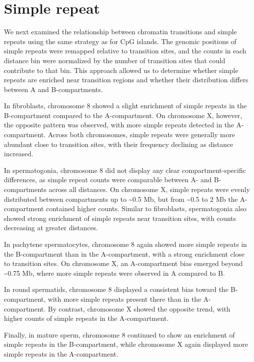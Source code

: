 \documentclass[
  a4paper,
  openany]{scrbook}
\begin{document}
\section{Simple repeat}\label{simple-repeat}

We next examined the relationship between chromatin transitions and
simple repeats using the same strategy as for CpG islands. The genomic
positions of simple repeats were remapped relative to transition sites,
and the counts in each distance bin were normalized by the number of
transition sites that could contribute to that bin. This approach
allowed us to determine whether simple repeats are enriched near
transition regions and whether their distribution differs between A and
B-compartments.

In fibroblasts, chromosome 8 showed a slight enrichment of simple
repeats in the B-compartment compared to the A-compartment. On
chromosome X, however, the opposite pattern was observed, with more
simple repeats detected in the A-compartment. Across both chromosomes,
simple repeats were generally more abundant close to transition sites,
with their frequency declining as distance increased.

In spermatogonia, chromosome 8 did not display any clear
compartment-specific differences, as simple repeat counts were
comparable between A- and B-compartments across all distances. On
chromosome X, simple repeats were evenly distributed between
compartments up to \textasciitilde0.5 Mb, but from \textasciitilde0.5 to
2 Mb the A-compartment contained higher counts. Similar to fibroblasts,
spermatogonia also showed strong enrichment of simple repeats near
transition sites, with counts decreasing at greater distances.

In pachytene spermatocytes, chromosome 8 again showed more simple
repeats in the B-compartment than in the A-compartment, with a strong
enrichment close to transition sites. On chromosome X, an A-compartment
bias emerged beyond \textasciitilde0.75 Mb, where more simple repeats
were observed in A compared to B.

In round spermatids, chromosome 8 displayed a consistent bias toward the
B-compartment, with more simple repeats present there than in the
A-compartment. By contrast, chromosome X showed the opposite trend, with
higher counts of simple repeats in the A-compartment.

Finally, in mature sperm, chromosome 8 continued to show an enrichment
of simple repeats in the B-compartment, while chromosome X again
displayed more simple repeats in the A-compartment.
\end{document}
